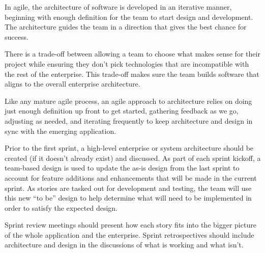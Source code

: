 \documentclass[sigplan,screen]{acmart}
\begin{document}
In agile, the architecture of software is developed in an iterative manner, beginning with enough definition for the team to start design and development. The architecture guides the team in a direction that gives the best chance for success.

There is a trade-off between allowing a team to choose what makes sense for their project while ensuring they don’t pick technologies that are incompatible with the rest of the enterprise. This trade-off makes sure the team builds software that aligns to the overall enterprise architecture.

Like any mature agile process, an agile approach to architecture relies on doing just enough definition up front to get started, gathering feedback as we go, adjusting as needed, and iterating frequently to keep architecture and design in sync with the emerging application.

Prior to the first sprint, a high-level enterprise or system architecture should be created (if it doesn’t already exist) and discussed. As part of each sprint kickoff, a team-based design is used to update the as-is design from the last sprint to account for feature additions and enhancements that will be made in the current sprint. As stories are tasked out for development and testing, the team will use this new “to be” design to help determine what will need to be implemented in order to satisfy the expected design.

Sprint review meetings should present how each story fits into the bigger picture of the whole application and the enterprise. Sprint retrospectives should include architecture and design in the discussions of what is working and what isn’t.
\end{document}
